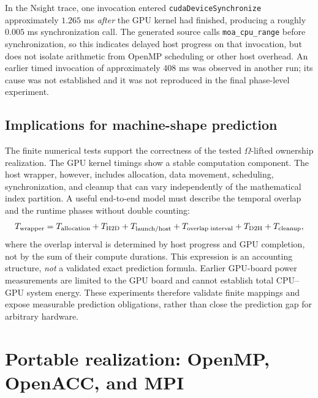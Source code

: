 \documentclass[11pt]{article}
\begin{document}
In the Nsight trace, one invocation entered \texttt{cudaDeviceSynchronize} approximately $1.265$ ms \emph{after} the GPU kernel had finished, producing a roughly $0.005$ ms synchronization call. The generated source calls \texttt{moa\_cpu\_range} before synchronization, so this indicates delayed host progress on that invocation, but does not isolate arithmetic from OpenMP scheduling or other host overhead. An earlier timed invocation of approximately $408$ ms was observed in another run; its cause was not established and it was not reproduced in the final phase-level experiment.

\subsection{Implications for machine-shape prediction}
The finite numerical tests support the correctness of the tested $\Omega$-lifted ownership realization. The GPU kernel timings show a stable computation component. The host wrapper, however, includes allocation, data movement, scheduling, synchronization, and cleanup that can vary independently of the mathematical index partition. A useful end-to-end model must describe the temporal overlap and the runtime phases without double counting:
\begin{equation}
T_{\rm wrapper}=T_{\rm allocation}+T_{\rm H2D}+T_{\rm launch/host}+T_{\rm overlap\;interval}+T_{\rm D2H}+T_{\rm cleanup},
\end{equation}
where the overlap interval is determined by host progress and GPU completion, not by the sum of their compute durations. This expression is an accounting structure, \emph{not} a validated exact prediction formula. Earlier GPU-board power measurements are limited to the GPU board and cannot establish total CPU--GPU system energy. These experiments therefore validate finite mappings and expose measurable prediction obligations, rather than close the prediction gap for arbitrary hardware.

\section{Portable realization: OpenMP, OpenACC, and MPI}
\label{sec:v14backends}
\end{document}
